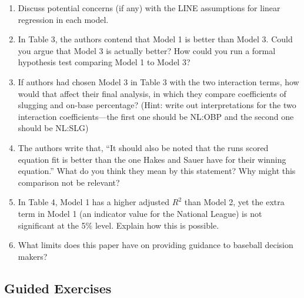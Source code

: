 \documentclass[
]{krantz}
\providecommand{\tightlist}{%
  \setlength{\itemsep}{0pt}\setlength{\parskip}{0pt}}
\begin{document}
\begin{enumerate}
  \begin{enumerate}
  \def\labelenumii{\alph{enumii}.}
  \tightlist
  \item
    Discuss potential concerns (if any) with the LINE assumptions for linear regression in each model.
  \item
    In Table 3, the authors contend that Model 1 is better than Model 3. Could you argue that Model 3 is actually better? How could you run a formal hypothesis test comparing Model 1 to Model 3?
  \item
    If authors had chosen Model 3 in Table 3 with the two interaction terms, how would that affect their final analysis, in which they compare coefficients of slugging and on-base percentage? (Hint: write out interpretations for the two interaction coefficients---the first one should be NL:OBP and the second one should be NL:SLG)
  \item
    The authors write that, ``It should also be noted that the runs scored equation fit is better than the one Hakes and Sauer have for their winning equation.'' What do you think they mean by this statement? Why might this comparison not be relevant?
  \item
    In Table 4, Model 1 has a higher adjusted \(R^2\) than Model 2, yet the extra term in Model 1 (an indicator value for the National League) is not significant at the 5\% level. Explain how this is possible.
  \item
    What limits does this paper have on providing guidance to baseball decision makers?
  \end{enumerate}
\end{enumerate}

\hypertarget{guided-exercises}{%
\subsection{Guided Exercises}\label{guided-exercises}}
\end{document}
